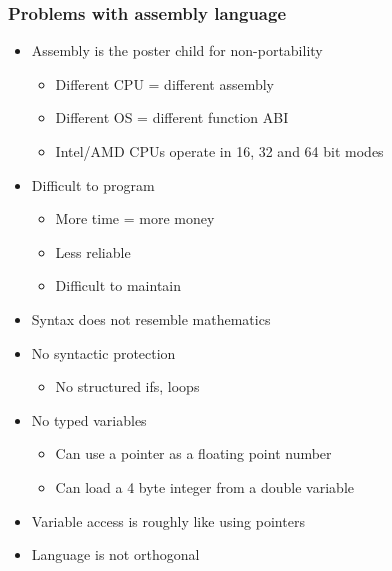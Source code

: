 \documentclass{beamer}
\begin{document}
\begin{frame}
    \frametitle{Problems with assembly language}
    \begin{itemize}
        \item Assembly is the poster child for non-portability
        \begin{itemize}
            \item Different CPU = different assembly
            \item Different OS = different function ABI
            \item Intel/AMD CPUs operate in 16, 32 and 64 bit modes
        \end{itemize}
        \item Difficult to program
        \begin{itemize}
            \item More time = more money
            \item Less reliable
            \item Difficult to maintain
        \end{itemize}
        \item Syntax does not resemble mathematics
        \item No syntactic protection
            \begin{itemize}
                \item No structured ifs, loops
            \end{itemize}
        \item No typed variables
            \begin{itemize}
                \item Can use a pointer as a floating point number
                \item Can load a 4 byte integer from a double variable
            \end{itemize}
        \item Variable access is roughly like using pointers
        \item Language is not orthogonal
    \end{itemize}
\end{frame}
\end{document}
